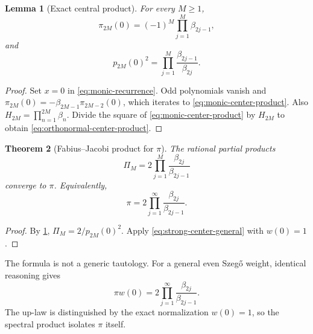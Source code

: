 \documentclass[11pt,oneside]{article}
\newtheorem{theorem}{Theorem}[section]
\newtheorem{lemma}[theorem]{Lemma}
\theoremstyle{definition}
\theoremstyle{remark}
\numberwithin{equation}{section}
\begin{document}
\begin{lemma}[Exact central product]
\label{lem:central-product}
For every $M\ge1$,
\begin{equation}
 \pi_{2M}(0)=(-1)^M\prod_{j=1}^{M}\beta_{2j-1},
 \label{eq:monic-center-product}
\end{equation}
and
\begin{equation}
 p_{2M}(0)^2
 =\prod_{j=1}^{M}\frac{\beta_{2j-1}}{\beta_{2j}}.
 \label{eq:orthonormal-center-product}
\end{equation}
\end{lemma}

\begin{proof}
Set $x=0$ in \cref{eq:monic-recurrence}.  Odd polynomials vanish and
$\pi_{2M}(0)=-\beta_{2M-1}\pi_{2M-2}(0)$, which iterates to
\cref{eq:monic-center-product}.  Also
$H_{2M}=\prod_{n=1}^{2M}\beta_n$.  Divide the square of
\cref{eq:monic-center-product} by $H_{2M}$ to obtain
\cref{eq:orthonormal-center-product}.
\end{proof}

\begin{theorem}[Fabius--Jacobi product for $\pi$]
\label{thm:pi-product}
The rational partial products
\begin{equation}
 \Pi_M=2\prod_{j=1}^{M}\frac{\beta_{2j}}{\beta_{2j-1}}
 \label{eq:pi-partial-product}
\end{equation}
converge to $\pi$.  Equivalently,
\begin{equation}
 \boxed{
 \pi=2\prod_{j=1}^{\infty}
          \frac{\beta_{2j}}{\beta_{2j-1}}.}
 \label{eq:pi-infinite-product}
\end{equation}
\end{theorem}

\begin{proof}
By \cref{lem:central-product},
$\Pi_M=2/p_{2M}(0)^2$.  Apply \cref{eq:strong-center-general} with
$w(0)=1$.
\end{proof}

The formula is not a generic tautology.  For a general even Szeg\H{o} weight,
identical reasoning gives
\begin{equation}
 \boxed{
 \pi w(0)=2\prod_{j=1}^{\infty}
          \frac{\beta_{2j}}{\beta_{2j-1}}.}
 \label{eq:general-center-product}
\end{equation}
The up-law is distinguished by the exact normalization $w(0)=1$, so the
spectral product isolates $\pi$ itself.
\end{document}
